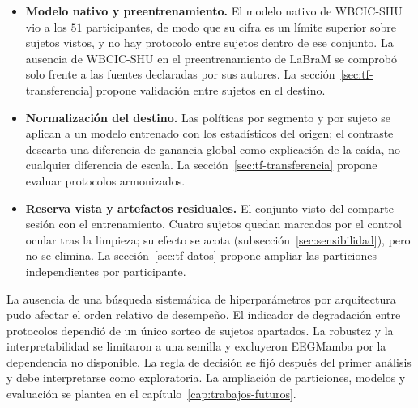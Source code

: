 \begin{itemize}
        armonización (tabla~\ref{tab:armonizacion}), la asimetría de volumen entre conjuntos ($144$ segmentos
        por persona en WBCIC-SHU frente a $360$) y la referencia de promedio común calculada sobre conjuntos de
        electrodos distintos forman parte de ese factor y no se separan de él. El \dsi{} y el \idp{} proceden
        de protocolos distintos y sus magnitudes no son comparables entre sí. La sección~\ref{sec:tf-transferencia} propone contrastes entre adquisiciones armonizadas.
  \item \textbf{Modelo nativo y preentrenamiento.} El modelo nativo de WBCIC-SHU vio a los $51$ participantes,
        de modo que su cifra es un límite superior sobre sujetos vistos, y no hay protocolo entre sujetos
        dentro de ese conjunto. La ausencia de WBCIC-SHU en el preentrenamiento de LaBraM se comprobó solo
        frente a las fuentes declaradas por sus autores. La sección~\ref{sec:tf-transferencia} propone validación entre sujetos en el destino.
  \item \textbf{Normalización del destino.} Las políticas por segmento y por sujeto se aplican a un modelo
        entrenado con los estadísticos del origen; el contraste descarta una diferencia de ganancia global
        como explicación de la caída, no cualquier diferencia de escala. La sección~\ref{sec:tf-transferencia} propone evaluar protocolos armonizados.
  \item \textbf{Reserva vista y artefactos residuales.} El conjunto visto del \dsi{} comparte sesión con el
        entrenamiento. Cuatro sujetos quedan marcados por el control ocular tras la limpieza; su efecto se
        acota (subsección~\ref{sec:sensibilidad}), pero no se elimina. La sección~\ref{sec:tf-datos} propone ampliar las particiones independientes por participante.
\end{itemize}



La ausencia de una búsqueda sistemática de hiperparámetros por arquitectura pudo afectar el orden relativo de desempeño. El indicador de degradación entre protocolos dependió de un único sorteo de sujetos apartados. La robustez y la interpretabilidad se limitaron a una semilla y excluyeron EEGMamba por la dependencia no disponible. La regla de decisión se fijó después del primer análisis y debe interpretarse como exploratoria. La ampliación de particiones, modelos y evaluación se plantea en el capítulo~\ref{cap:trabajos-futuros}.
